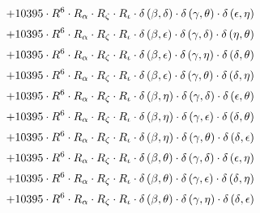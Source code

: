 \begin{subequations}
\begin{gather}
 \\[0.2em] \notag 		 + 10395 \cdot R^{6} \cdot R_{\alpha{}} \cdot R_{\zeta{}} \cdot R_{\iota{}} \cdot \delta{}\left(\beta{}, \delta{}\right) \cdot \delta{}\left(\gamma{}, \theta{}\right) \cdot \delta{}\left(\epsilon{}, \eta{}\right) 
 \\[0.2em] \notag 		 + 10395 \cdot R^{6} \cdot R_{\alpha{}} \cdot R_{\zeta{}} \cdot R_{\iota{}} \cdot \delta{}\left(\beta{}, \epsilon{}\right) \cdot \delta{}\left(\gamma{}, \delta{}\right) \cdot \delta{}\left(\eta{}, \theta{}\right) 
 \\[0.2em] \notag 		 + 10395 \cdot R^{6} \cdot R_{\alpha{}} \cdot R_{\zeta{}} \cdot R_{\iota{}} \cdot \delta{}\left(\beta{}, \epsilon{}\right) \cdot \delta{}\left(\gamma{}, \eta{}\right) \cdot \delta{}\left(\delta{}, \theta{}\right) 
 \\[0.2em] \notag 		 + 10395 \cdot R^{6} \cdot R_{\alpha{}} \cdot R_{\zeta{}} \cdot R_{\iota{}} \cdot \delta{}\left(\beta{}, \epsilon{}\right) \cdot \delta{}\left(\gamma{}, \theta{}\right) \cdot \delta{}\left(\delta{}, \eta{}\right) 
 \\[0.2em] \notag 		 + 10395 \cdot R^{6} \cdot R_{\alpha{}} \cdot R_{\zeta{}} \cdot R_{\iota{}} \cdot \delta{}\left(\beta{}, \eta{}\right) \cdot \delta{}\left(\gamma{}, \delta{}\right) \cdot \delta{}\left(\epsilon{}, \theta{}\right) 
 \\[0.2em] \notag 		 + 10395 \cdot R^{6} \cdot R_{\alpha{}} \cdot R_{\zeta{}} \cdot R_{\iota{}} \cdot \delta{}\left(\beta{}, \eta{}\right) \cdot \delta{}\left(\gamma{}, \epsilon{}\right) \cdot \delta{}\left(\delta{}, \theta{}\right) 
 \\[0.2em] \notag 		 + 10395 \cdot R^{6} \cdot R_{\alpha{}} \cdot R_{\zeta{}} \cdot R_{\iota{}} \cdot \delta{}\left(\beta{}, \eta{}\right) \cdot \delta{}\left(\gamma{}, \theta{}\right) \cdot \delta{}\left(\delta{}, \epsilon{}\right) 
 \\[0.2em] \notag 		 + 10395 \cdot R^{6} \cdot R_{\alpha{}} \cdot R_{\zeta{}} \cdot R_{\iota{}} \cdot \delta{}\left(\beta{}, \theta{}\right) \cdot \delta{}\left(\gamma{}, \delta{}\right) \cdot \delta{}\left(\epsilon{}, \eta{}\right) 
 \\[0.2em] \notag 		 + 10395 \cdot R^{6} \cdot R_{\alpha{}} \cdot R_{\zeta{}} \cdot R_{\iota{}} \cdot \delta{}\left(\beta{}, \theta{}\right) \cdot \delta{}\left(\gamma{}, \epsilon{}\right) \cdot \delta{}\left(\delta{}, \eta{}\right) 
 \\[0.2em] \notag 		 + 10395 \cdot R^{6} \cdot R_{\alpha{}} \cdot R_{\zeta{}} \cdot R_{\iota{}} \cdot \delta{}\left(\beta{}, \theta{}\right) \cdot \delta{}\left(\gamma{}, \eta{}\right) \cdot \delta{}\left(\delta{}, \epsilon{}\right) 

\end{gather}
\end{subequations}
